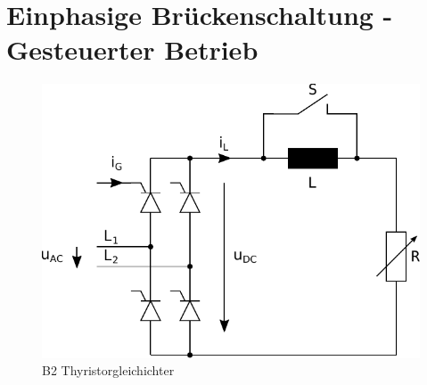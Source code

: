 \section{Einphasige Brückenschaltung - Gesteuerter Betrieb}

\begin{figure}[h!]
    \centering
    \includegraphics[scale=1]{./../fig/b2_thyristor.pdf}
    \caption{B2 Thyristorgleichichter}
    \label{fig:b2_tyristor}
\end{figure}
